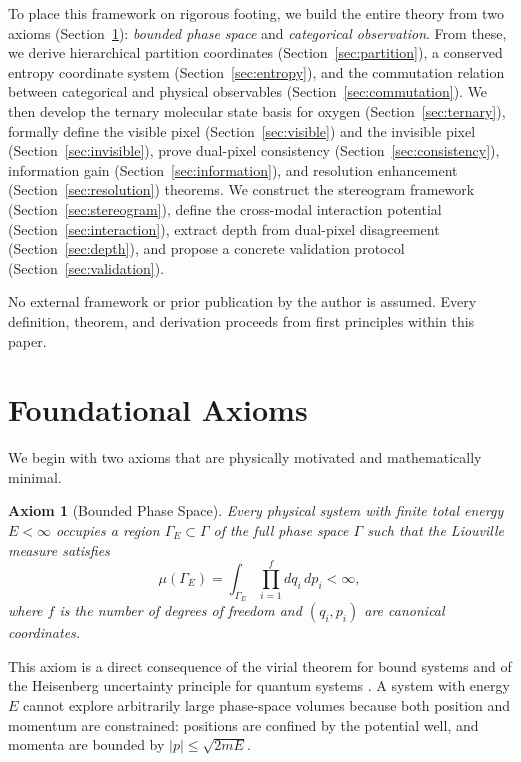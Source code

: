 \documentclass[11pt,twocolumn,a4paper]{article}
\newtheorem{axiom}{Axiom}
\newcommand{\phasespace}{\Gamma}
\begin{document}
To place this framework on rigorous footing, we build the entire theory from two axioms (Section~\ref{sec:axioms}): \emph{bounded phase space} and \emph{categorical observation}.
From these, we derive hierarchical partition coordinates (Section~\ref{sec:partition}), a conserved entropy coordinate system (Section~\ref{sec:entropy}), and the commutation relation between categorical and physical observables (Section~\ref{sec:commutation}).
We then develop the ternary molecular state basis for oxygen (Section~\ref{sec:ternary}), formally define the visible pixel (Section~\ref{sec:visible}) and the invisible pixel (Section~\ref{sec:invisible}), prove dual-pixel consistency (Section~\ref{sec:consistency}), information gain (Section~\ref{sec:information}), and resolution enhancement (Section~\ref{sec:resolution}) theorems.
We construct the stereogram framework (Section~\ref{sec:stereogram}), define the cross-modal interaction potential (Section~\ref{sec:interaction}), extract depth from dual-pixel disagreement (Section~\ref{sec:depth}), and propose a concrete validation protocol (Section~\ref{sec:validation}).

No external framework or prior publication by the author is assumed.
Every definition, theorem, and derivation proceeds from first principles within this paper.


\section{Foundational Axioms}\label{sec:axioms}

We begin with two axioms that are physically motivated and mathematically minimal.

\begin{axiom}[Bounded Phase Space]\label{ax:bounded}
Every physical system with finite total energy $E < \infty$ occupies a region $\phasespace_E \subset \phasespace$ of the full phase space $\phasespace$ such that the Liouville measure satisfies
\begin{equation}\label{eq:bounded}
\mu(\phasespace_E) = \int_{\phasespace_E} \prod_{i=1}^{f} dq_i\, dp_i < \infty,
\end{equation}
where $f$ is the number of degrees of freedom and $(q_i, p_i)$ are canonical coordinates.
\end{axiom}

This axiom is a direct consequence of the virial theorem for bound systems \citep{Goldstein2002} and of the Heisenberg uncertainty principle for quantum systems \citep{Heisenberg1927}.
A system with energy $E$ cannot explore arbitrarily large phase-space volumes because both position and momentum are constrained: positions are confined by the potential well, and momenta are bounded by $|p| \leq \sqrt{2mE}$.
\end{document}
